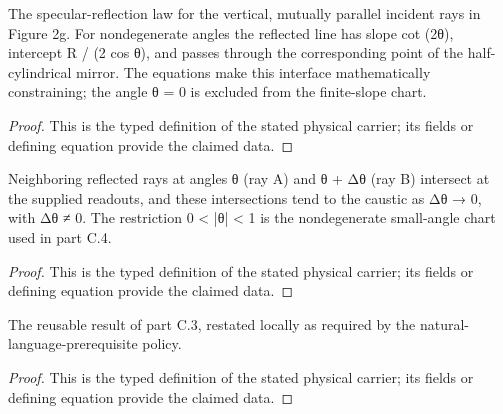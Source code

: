 \begin{definition}
  \label{def:physics:IPhO_2026_2_C_4:aux006}
  The specular-reflection law for the vertical, mutually parallel incident rays in Figure 2g. For nondegenerate angles the reflected line has slope cot (2θ), intercept R / (2 cos θ), and passes through the corresponding point of the half-cylindrical mirror. The equations make this interface mathematically constraining; the angle θ = 0 is excluded from the finite-slope chart.
\end{definition}
\begin{proof}
  This is the typed definition of the stated physical carrier; its fields or defining equation provide the claimed data.
\end{proof}

\begin{definition}
  \label{def:physics:IPhO_2026_2_C_4:aux007}
  Neighboring reflected rays at angles θ (ray A) and θ + Δθ (ray B) intersect at the supplied readouts, and these intersections tend to the caustic as Δθ → 0, with Δθ ≠ 0. The restriction 0 < |θ| < 1 is the nondegenerate small-angle chart used in part C.4.
\end{definition}
\begin{proof}
  This is the typed definition of the stated physical carrier; its fields or defining equation provide the claimed data.
\end{proof}

\begin{definition}
  \label{def:physics:IPhO_2026_2_C_4:aux008}
  The reusable result of part C.3, restated locally as required by the natural-language-prerequisite policy.
\end{definition}
\begin{proof}
  This is the typed definition of the stated physical carrier; its fields or defining equation provide the claimed data.
\end{proof}

